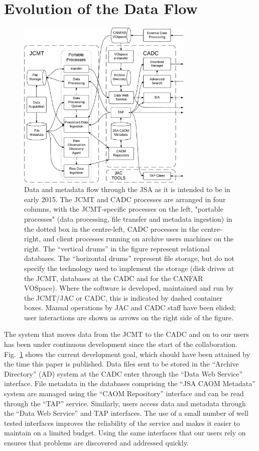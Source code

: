 \documentclass[final,authoryear,5p,times,twocolumn]{elsarticle}
\newcommand*\figref[1]{Fig.~\ref{#1}}
\begin{document}
\section{Evolution of the Data Flow}

\begin{figure}[!ht]
\begin{center}
\includegraphics[width=0.75\textwidth]{jsa_dataflow_2015}
\end{center}
\caption{Data and metadata flow through the JSA as it is intended to be in early 2015.  The JCMT and CADC processes are arranged in four columns, with the JCMT-specific processes on the left, "portable processes" (data processing, file transfer and metadata ingestion) in the dotted box in the centre-left, CADC processes in the centre-right, and client processes running on archive users machines on the right.  The ``vertical drums'' in the figure represent relational databases.  The ``horizontal drums'' represent file storage, but do not specify the technology used to implement the storage (disk drives at the JCMT, databases at the CADC and for the CANFAR VOSpace).  Where the software is developed, maintained and run by the JCMT/JAC or CADC, this is indicated by dashed container boxes.     Manual operations by JAC and CADC staff have been elided; user interactions are shown as arrows on the right side of the figure.}
\label{fig:jsadataflow}
\end{figure}

The system that moves data from the JCMT to the CADC and on to our users has been under continuous development since the start of the collaboration.  \figref{fig:jsadataflow} shows the current development goal, which should have been attained by the time this paper is published.  Data files sent to be stored in the ``Archive Directory'' (AD) system at the CADC enter through the ``Data Web Service'' interface.  File metadata in the databases comprising the ``JSA CAOM Metadata'' system are managed using the ``CAOM Repository'' interface and can be read through the ``TAP'' service.  Similarly, users access data and metadata through the ``Data Web Service'' and TAP interfaces.  The use of a small number of well tested interfaces improves the reliability of the service and makes it easier to maintain on a limited budget.   Using the same interfaces that our users rely on ensures that problems are discovered and addressed quickly.
\end{document}
